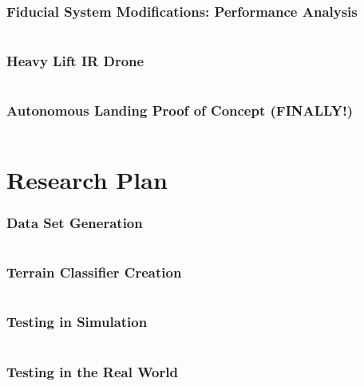 \documentclass[aspectratio=169]{rubeamer}
\begin{document}
\begin{frame}
  \frametitle{Fiducial System Modifications: Performance Analysis}
  \begin{columns}
    \centering
  \end{columns}
\end{frame}

\begin{frame}
  \frametitle{Heavy Lift IR Drone}
  \begin{columns}
    \centering
  \end{columns}
\end{frame}

\begin{frame}
  \frametitle{Autonomous Landing Proof of Concept \textbf{(FINALLY!)}}
  \begin{columns}
    \centering
  \end{columns}
\end{frame}

\section{Research Plan}

\begin{frame}
  \frametitle{Data Set Generation}
  \begin{columns}
    \centering
  \end{columns}
\end{frame}

\begin{frame}
  \frametitle{Terrain Classifier Creation}
  \begin{columns}
    \centering
  \end{columns}
\end{frame}

\begin{frame}
  \frametitle{Testing in Simulation}
  \begin{columns}
    \centering
  \end{columns}
\end{frame}

\begin{frame}
  \frametitle{Testing in the Real World}
  \begin{columns}
    \centering
  \end{columns}
\end{frame}
\end{document}
